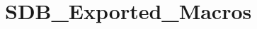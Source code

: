 \hypertarget{group___s_d_b___exported___macros}{}\section{S\+D\+B\+\_\+\+Exported\+\_\+\+Macros}
\label{group___s_d_b___exported___macros}

